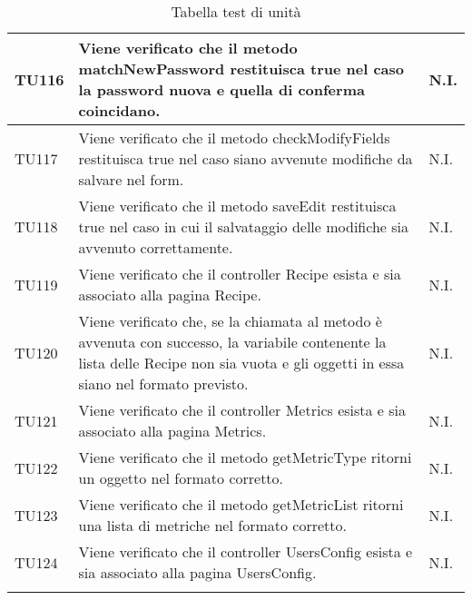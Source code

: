 \begin{center}
\begin{longtable}{| p{2cm} | p{8cm} | p{2.5cm} |}
					\hline
					TU116 & Viene verificato che il metodo matchNewPassword restituisca true nel caso la password nuova e quella di conferma coincidano. & N.I.\\
					\hline
					TU117 & Viene verificato che il metodo checkModifyFields restituisca true nel caso siano avvenute modifiche da salvare nel form. & N.I.\\
					\hline
					TU118 & Viene verificato che il metodo saveEdit restituisca true nel caso in cui il salvataggio delle modifiche sia avvenuto correttamente. & N.I.\\
					\hline
					TU119 & Viene verificato che il controller Recipe esista e sia associato alla pagina Recipe. & N.I.\\
					\hline
					TU120 & Viene verificato che, se la chiamata al metodo è avvenuta con successo, la variabile contenente la lista delle Recipe non sia vuota e gli oggetti in essa siano nel formato previsto. & N.I.\\
					\hline
					TU121 & Viene verificato che il controller Metrics esista e sia associato alla pagina Metrics. & N.I.\\
					\hline
					TU122 & Viene verificato che il metodo getMetricType ritorni un oggetto nel formato corretto. & N.I.\\
					\hline
					TU123 & Viene verificato che il metodo getMetricList ritorni una lista di metriche nel formato corretto. & N.I.\\
					\hline
					TU124 & Viene verificato che il controller UsersConfig esista e sia associato alla pagina UsersConfig. & N.I.\\
					\hline
					\caption{Tabella test di unità}
			\end{longtable}
			\egroup
			\end{center}
			

